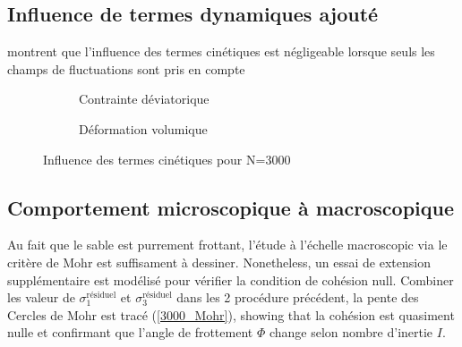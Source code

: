\documentclass[5p,authoryear,square]{elsarticle}
\begin{document}
\subsection{Influence de termes dynamiques ajouté}\label{termeDynamique}
 montrent que l'influence des termes cinétiques est négligeable lorsque seuls les champs de fluctuations sont pris en compte
\begin{figure}[htbp]
    \centering
    \begin{subfigure}[b]{0.45\textwidth}
            \centering
        \scalebox{0.5}{}
        \caption{Contrainte déviatorique}
        \label{3000_kinetic_q}
    \end{subfigure}
    \hfill
    \begin{subfigure}[b]{0.45\textwidth}
            \centering
        \scalebox{0.5}{}
        \caption{Déformation volumique}
        \label{3000_kinetic_ev}
    \end{subfigure}
    \caption{Influence des termes cinétiques pour N=3000}
    \label{3000_kinetic_comp}
\end{figure}

\subsection{Comportement microscopique à macroscopique}\label{figureMuy}
Au fait que le sable est purrement frottant, l'étude à l'échelle macroscopic via le critère de Mohr est suffisament à dessiner.
Nonetheless, un essai de extension supplémentaire est modélisé pour vérifier la condition de cohésion null.
Combiner les valeur de $\sigma_1^{\text{résiduel}}$ et $\sigma_3^{\text{résiduel}}$ dans les 2 procédure précédent, la pente des Cercles de Mohr est tracé (\cref{3000_Mohr}), showing that la cohésion est quasiment nulle et confirmant que l'angle de frottement $\Phi$ change selon nombre d'inertie $I$.
\end{document}
